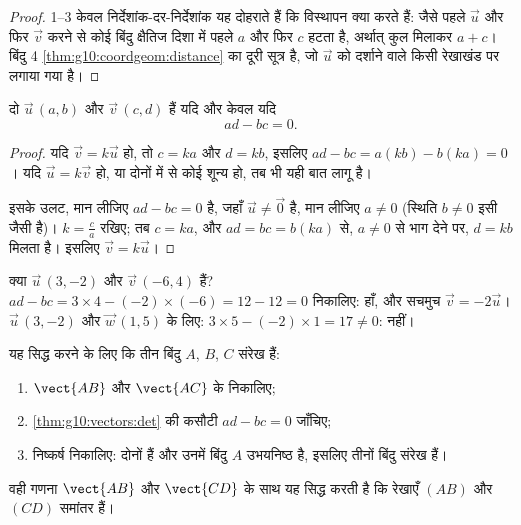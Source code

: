 \begin{proof}
1--3 केवल निर्देशांक-दर-निर्देशांक यह दोहराते हैं कि विस्थापन क्या करते हैं:
जैसे पहले $\vec u$ और फिर $\vec v$ करने से कोई बिंदु क्षैतिज दिशा में पहले $a$
और फिर $c$ हटता है, अर्थात् कुल मिलाकर $a + c$। बिंदु 4 \cref{thm:g10:coordgeom:distance} का दूरी सूत्र
है, जो $\vec u$ को दर्शाने वाले किसी रेखाखंड पर लगाया गया है।
\end{proof}

\begin{theorem}[संरेखता की कसौटी]\label{thm:g10:vectors:det}
दो  $\vec u\,(a, b)$ और $\vec v\,(c, d)$  हैं यदि और केवल यदि
\[
ad - bc = 0 .
\]
\end{theorem}

\begin{proof}
यदि $\vec v = k\vec u$ हो, तो $c = ka$ और $d = kb$, इसलिए $ad - bc = a(kb) - b(ka) = 0$। यदि $\vec u = k \vec v$ हो, या दोनों में से
कोई  शून्य हो, तब भी यही बात लागू है।

इसके उलट, मान लीजिए $ad - bc = 0$ है, जहाँ $\vec u \neq \vec 0$ है, मान लीजिए $a \neq 0$ (स्थिति $b \neq 0$
इसी जैसी है)। $k = \frac{c}{a}$ रखिए; तब $c = ka$, और $ad = bc = b(ka)$ से, $a \neq 0$ से भाग देने पर,
$d = kb$ मिलता है। इसलिए $\vec v = k\vec u$।
\end{proof}

\begin{example}\label{ex:g10:vectors:det}
क्या $\vec u\,(3, -2)$ और $\vec v\,(-6, 4)$  हैं? $ad - bc = 3 \times 4 - (-2)\times(-6) = 12 - 12 = 0$ निकालिए: हाँ, और सचमुच $\vec v = -2\vec u$। $\vec u\,(3, -2)$
और $\vec w\,(1, 5)$ के लिए: $3 \times 5 - (-2) \times 1 = 17 \neq 0$:  नहीं।
\end{example}

\begin{method}[संरेखण और समांतरता]\label{met:g10:vectors:alignment}
यह सिद्ध करने के लिए कि तीन बिंदु $A$, $B$, $C$ संरेख हैं:
\begin{enumerate}
  \item $\vect{AB}$ और $\vect{AC}$ के  निकालिए;
  \item \cref{thm:g10:vectors:det} की कसौटी $ad - bc = 0$ जाँचिए;
  \item निष्कर्ष निकालिए: दोनों   हैं और उनमें बिंदु $A$
        उभयनिष्ठ है, इसलिए तीनों बिंदु संरेख हैं।
\end{enumerate}
वही गणना $\vect{AB}$ और $\vect{CD}$ के साथ यह सिद्ध करती है कि रेखाएँ $(AB)$ और $(CD)$
समांतर हैं।
\end{method}

